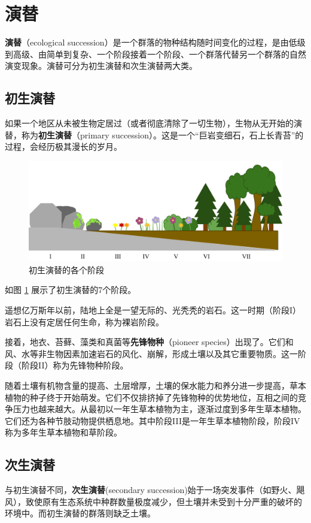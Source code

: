 \section{演替}
\textbf{演替}（ecological succession）是一个群落的物种结构随时间变化的过程，是由低级到高级、由简单到复杂、一个阶段接着一个阶段、一个群落代替另一个群落的自然演变现象。演替可分为初生演替和次生演替两大类。

\subsection{初生演替}
如果一个地区从未被生物定居过（或者彻底清除了一切生物），生物从无开始的演替，称为\textbf{初生演替}（primary succession）。这是一个“巨岩变细石，石上长青苔”的过程，会经历极其漫长的岁月。

\begin{figure}[htbp]
    \centering
    \includegraphics[width=400pt]{images/primary-succession.png}
    \caption{初生演替的各个阶段}
    \label{fig:primary-succession}
\end{figure}

如图 \ref{fig:primary-succession} 展示了初生演替的7个阶段。

遥想亿万斯年以前，陆地上全是一望无际的、光秃秃的岩石。这一时期（阶段I）岩石上没有定居任何生命，称为裸岩阶段。

接着，地衣、苔藓、藻类和真菌等\textbf{先锋物种}（pioneer species）出现了。它们和风、水等非生物因素加速岩石的风化、崩解，形成土壤以及其它重要物质。这一阶段（阶段II）称为先锋物种阶段。

随着土壤有机物含量的提高、土层增厚，土壤的保水能力和养分进一步提高，草本植物的种子终于开始萌发。它们不仅排挤掉了先锋物种的优势地位，互相之间的竞争压力也越来越大。从最初以一年生草本植物为主，逐渐过度到多年生草本植物。它们还为各种节肢动物提供栖息地。其中阶段III是一年生草本植物阶段，阶段IV称为多年生草本植物和草阶段。

\subsection{次生演替}
与初生演替不同，\textbf{次生演替}(secondary succession)始于一场突发事件（如野火、飓风），致使原有生态系统中种群数量极度减少，但土壤并未受到十分严重的破坏的环境中。而初生演替的群落则缺乏土壤。

